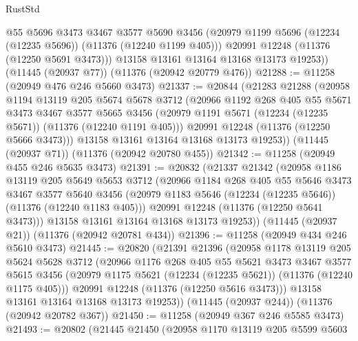 \begin{lexlean}{RustStd}
\begin{coremodule}
{\begin{coremodule}
{{{{{{{{{{{{{{{{{{{{{{{{{{{{{{{{{{{{{{{{{{{{{{{{{{{{{{{{{{{{{{{{{{{{{{{{{{{{{{{{{{{{{          @55
          @5696
          @3473
          @3467
          @3577
          @5690
          @3456
          (@20979 @1199 @5696 (@12234 (@12235 @5696)) (@11376 (@12240 @1199 @405)))
          @20991
          @12248
          (@11376 (@12250 @5691 @3473)))
        @13158
        @13161
        @13164
        @13168
        @13173
        @19253))
    (@11445 (@20937 @77))
    (@11376 (@20942 @20779 @476))
@21288 := @11258 (@20949 @476 @246 @5660 @3473)
@21337 := @20844
    (@21283
      @21288
      (@20958
        @1194
        @13119
        @205
        @5674
        @5678
        @3712
        (@20966
          @1192
          @268
          @405
          @55
          @5671
          @3473
          @3467
          @3577
          @5665
          @3456
          (@20979 @1191 @5671 (@12234 (@12235 @5671)) (@11376 (@12240 @1191 @405)))
          @20991
          @12248
          (@11376 (@12250 @5666 @3473)))
        @13158
        @13161
        @13164
        @13168
        @13173
        @19253))
    (@11445 (@20937 @71))
    (@11376 (@20942 @20780 @455))
@21342 := @11258 (@20949 @455 @246 @5635 @3473)
@21391 := @20832
    (@21337
      @21342
      (@20958
        @1186
        @13119
        @205
        @5649
        @5653
        @3712
        (@20966
          @1184
          @268
          @405
          @55
          @5646
          @3473
          @3467
          @3577
          @5640
          @3456
          (@20979 @1183 @5646 (@12234 (@12235 @5646)) (@11376 (@12240 @1183 @405)))
          @20991
          @12248
          (@11376 (@12250 @5641 @3473)))
        @13158
        @13161
        @13164
        @13168
        @13173
        @19253))
    (@11445 (@20937 @21))
    (@11376 (@20942 @20781 @434))
@21396 := @11258 (@20949 @434 @246 @5610 @3473)
@21445 := @20820
    (@21391
      @21396
      (@20958
        @1178
        @13119
        @205
        @5624
        @5628
        @3712
        (@20966
          @1176
          @268
          @405
          @55
          @5621
          @3473
          @3467
          @3577
          @5615
          @3456
          (@20979 @1175 @5621 (@12234 (@12235 @5621)) (@11376 (@12240 @1175 @405)))
          @20991
          @12248
          (@11376 (@12250 @5616 @3473)))
        @13158
        @13161
        @13164
        @13168
        @13173
        @19253))
    (@11445 (@20937 @244))
    (@11376 (@20942 @20782 @367))
@21450 := @11258 (@20949 @367 @246 @5585 @3473)
@21493 := @20802
    (@21445
      @21450
      (@20958
        @1170
        @13119
        @205
        @5599
        @5603
}}}}}}}}}}}}}}}}}}}}}}}}}}}}}}}}}}}}}}}}}}}}}}}}}}}}}}}}}}}}}}}}}}}}}}}}}}}}}}}}}}}}}
\end{coremodule}}
\end{coremodule}
\end{lexlean}
